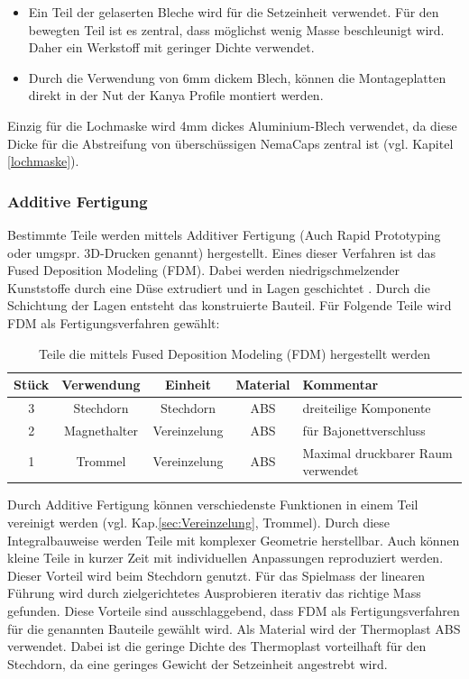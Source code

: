 \begin{itemize}
	\item Ein Teil der gelaserten Bleche wird für die Setzeinheit verwendet. Für den bewegten Teil ist es zentral, dass möglichst wenig Masse beschleunigt wird. Daher ein Werkstoff mit geringer Dichte verwendet.
	
	\item Durch die Verwendung von 6mm dickem Blech, können die Montageplatten direkt in der Nut der Kanya Profile montiert werden.
\end{itemize}

Einzig für die Lochmaske wird 4mm dickes Aluminium-Blech verwendet, da diese Dicke für die Abstreifung von überschüssigen NemaCaps zentral ist (vgl. Kapitel \ref{lochmaske}).

\subsubsection{Additive Fertigung}
Bestimmte Teile werden mittels Additiver Fertigung (Auch Rapid Prototyping oder umgspr. 3D-Drucken genannt) hergestellt. Eines dieser Verfahren ist das Fused Deposition Modeling (FDM). Dabei werden niedrigschmelzender Kunststoffe durch eine Düse extrudiert und in Lagen geschichtet \cite{fdm}. Durch die Schichtung der Lagen entsteht das konstruierte Bauteil. Für Folgende Teile wird FDM als Fertigungsverfahren gewählt:
\begin{table}[H]
\begin{tabular}{|c|c|c|c|l|}
	\hline 
	Stück & Verwendung & Einheit & Material & Kommentar \\ 
	\hline 
	3 & Stechdorn & Stechdorn & ABS & dreiteilige Komponente \\ 
	\hline 
	2 & Magnethalter & Vereinzelung & ABS & für Bajonettverschluss \\ 
	\hline 
	1 & Trommel & Vereinzelung & ABS & Maximal druckbarer Raum verwendet \\ 
	\hline 
\end{tabular} 
	\caption{Teile die mittels Fused Deposition Modeling (FDM) hergestellt werden}
	\label{tab:fdm}
\end{table} 
Durch Additive Fertigung können verschiedenste Funktionen in einem Teil vereinigt werden (vgl. Kap.\ref{sec:Vereinzelung}, Trommel). Durch diese Integralbauweise werden Teile mit komplexer Geometrie herstellbar. Auch können kleine Teile in kurzer Zeit mit individuellen Anpassungen reproduziert werden. Dieser Vorteil wird beim Stechdorn genutzt. Für das Spielmass der linearen Führung wird durch zielgerichtetes Ausprobieren iterativ das richtige Mass gefunden. Diese Vorteile sind ausschlaggebend, dass FDM als Fertigungsverfahren für die genannten Bauteile gewählt wird.
\newline
Als Material wird der Thermoplast ABS verwendet. Dabei ist die geringe Dichte des Thermoplast vorteilhaft für den Stechdorn, da eine geringes Gewicht der Setzeinheit angestrebt wird.
\newline


